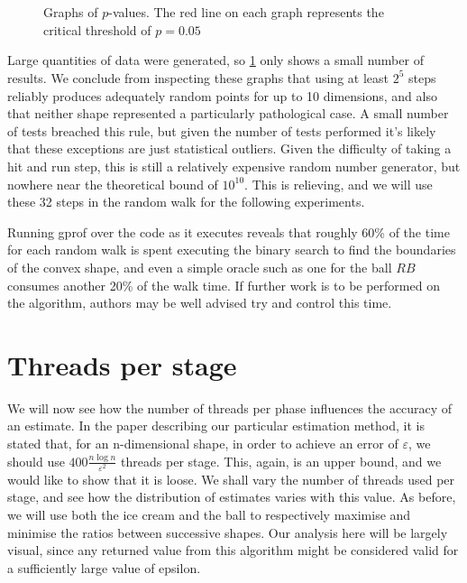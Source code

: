 \begin{figure}
\centering
{}
\\
\\
\caption{Graphs of $p$-values. The red line on each graph represents the critical threshold of $p=0.05$}
\label{fig_steps}
\end{figure}

Large quantities of data were generated, so \ref{fig_steps} only shows a small number of results. We conclude from inspecting these graphs that using at least $2^5$ steps reliably produces adequately random points for up to 10 dimensions, and also that neither shape represented a particularly pathological case. A small number of tests breached this rule, but given the number of tests performed it's likely that these exceptions are just statistical outliers. Given the difficulty of taking a hit and run step, this is still a relatively expensive random number generator, but nowhere near the theoretical bound of $10^{10}$. This is relieving, and we will use these 32 steps in the random walk for the following experiments.

Running gprof over the code as it executes reveals that roughly 60\% of the time for each random walk is spent executing the binary search to find the boundaries of the convex shape, and even a simple oracle such as one for the ball $RB$ consumes another 20\% of the walk time. If further work is to be performed on the algorithm, authors may be well advised try and control this time.

\section{Threads per stage}\label{sec_error}

We will now see how the number of threads per phase influences the accuracy of an estimate. In the paper describing our particular estimation method, it is stated that, for an n-dimensional shape, in order to achieve an error of $\varepsilon$, we should use $400\frac{n\log n}{\varepsilon^2}$ threads per stage. This, again, is an upper bound, and we would like to show that it is loose. We shall vary the number of threads used per stage, and see how the distribution of estimates varies with this value. As before, we will use both the ice cream and the ball to respectively maximise and minimise the ratios between successive shapes. Our analysis here will be largely visual, since any returned value from this algorithm might be considered valid for a sufficiently large value of epsilon.

